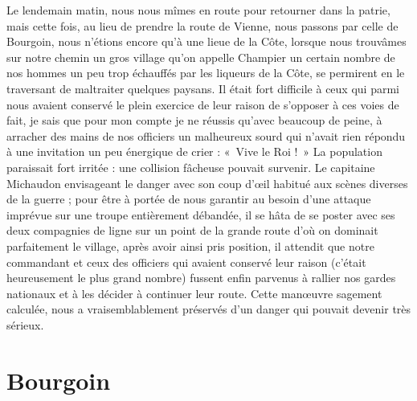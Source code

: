 \documentclass[11pt,a4paper]{report}
\begin{document}
Le lendemain matin, nous nous mîmes en route pour retourner dans la patrie, mais cette fois, au lieu de prendre la route de Vienne, nous passons par celle de Bourgoin, nous n'étions encore qu'à une lieue de la Côte, lorsque nous trouvâmes sur notre chemin un gros village qu'on appelle Champier un certain nombre de nos hommes un peu trop échauffés par les liqueurs de la Côte, se permirent en le traversant de maltraiter quelques paysans. Il était fort difficile à ceux qui parmi nous avaient conservé le plein exercice de leur raison de s'opposer à ces voies de fait, je sais que pour mon compte je ne réussis qu'avec beaucoup de peine, à arracher des mains de nos officiers un malheureux sourd qui n'avait rien répondu à une invitation un peu énergique de crier : «~Vive le Roi !~» La population paraissait fort irritée : une collision fâcheuse pouvait survenir. Le capitaine Michaudon envisageant le danger avec son coup d'œil habitué aux scènes diverses de la guerre ; pour être à portée de nous garantir au besoin d'une attaque imprévue sur une troupe entièrement débandée, il se hâta de se poster avec ses deux compagnies de ligne sur un point de la grande route d'où on dominait parfaitement le village, après avoir ainsi pris position, il attendit que notre commandant et ceux des officiers qui avaient conservé leur raison (c'était heureusement le plus grand nombre) fussent enfin parvenus à rallier nos gardes nationaux et à les décider à continuer leur route. Cette manœuvre sagement calculée, nous a vraisemblablement préservés d'un danger qui pouvait devenir très sérieux.

\section*{Bourgoin}
\end{document}
